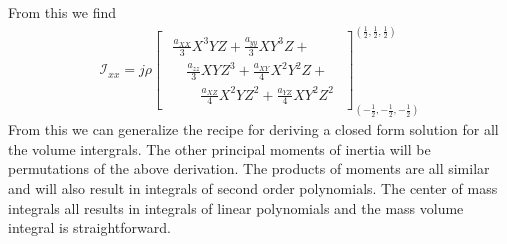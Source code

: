 \documentclass[twocolumn]{article}
\newcommand{\inertia}{\ensuremath{\mathcal{I} }}
\begin{document}
From this we find
\begin{subequations}
  \begin{align*}
    \inertia_{xx}
    =
    j \rho
    \begin{bmatrix}
      \begin{matrix}
        \frac{a_{XX}}{3} X^3 Y Z +\frac{a_{yy}}{3} X Y^3 Z +\\
        \quad \frac{a_{zz}}{3} X Y Z^3 +  \frac{a_{XY}}{4} X^2 Y^2  Z +\\
        \quad \quad         \frac{a_{XZ}}{4} X^2 Y  Z^2 + \frac{a_{YZ}}{4} X Y^2  Z^2      
      \end{matrix}
    \end{bmatrix}_{ (-\frac{1}{2}, -\frac{1}{2}, -\frac{1}{2} ) } ^{ (
      \frac{1}{2}, \frac{1}{2}, \frac{1}{2})  }
  \end{align*}
\end{subequations}
From this we can generalize the recipe for deriving a closed form solution for
all the volume intergrals. The other principal moments of inertia will be
permutations of the above derivation. The products of moments are all similar
and will also result in integrals of second order polynomials. The center of
mass integrals all results in integrals of linear polynomials and the mass
volume integral is straightforward.






\end{document}
